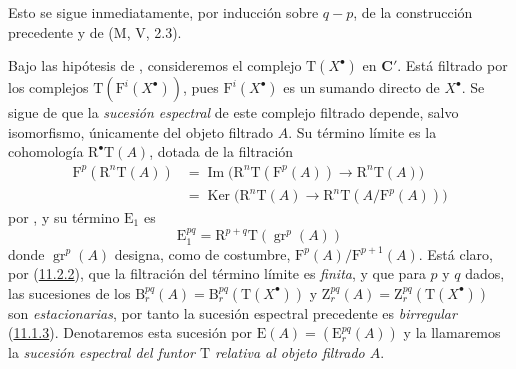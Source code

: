 Esto se sigue inmediatamente, por inducción sobre $q-p$, de la construcción
precedente y de (M, V, 2.3).

\begin{env}[13.6.4]
\label{0.13.6.4}
\label{0.13.6.4-fr}
Bajo las hipótesis de , consideremos el complejo
$\mathrm T(X^\bullet)$ en $\boldsymbol{C}'$.
Está filtrado por los complejos
$\mathrm T(\mathrm F^i(X^\bullet))$, pues
$\mathrm F^i(X^\bullet)$ es un sumando directo de $X^\bullet$.
Se sigue de  que la \emph{sucesión espectral} de
este complejo filtrado depende, salvo isomorfismo, únicamente del
objeto filtrado $A$.
Su término límite es la cohomología $\mathrm R^\bullet\mathrm T(A)$, dotada
de la filtración
\begin{equation}
\label{0.13.6.4.1-fr}
\tag{13.6.4.1}
\begin{split}
\mathrm F^p(\mathrm R^n\mathrm T(A))
&=\operatorname{Im}\bigl(\mathrm R^n\mathrm T(\mathrm F^p(A))
\longrightarrow\mathrm R^n\mathrm T(A)\bigr)\\
&=\operatorname{Ker}\bigl(\mathrm R^n\mathrm T(A)
\longrightarrow\mathrm R^n\mathrm T(A/\mathrm F^p(A))\bigr)
\end{split}
\end{equation}
por , y su término $\mathrm E_1$ es
\begin{equation}
\label{0.13.6.4.2-fr}
\tag{13.6.4.2}
\mathrm E_1^{pq}=\mathrm R^{p+q}\mathrm T(\operatorname{gr}^p(A))
\end{equation}
donde $\operatorname{gr}^p(A)$ designa, como de costumbre, $\mathrm F^p(A)/\mathrm F^{p+1}(A)$. Está claro, por (\hyperref[0.11.2.2-fr]{11.2.2}), que la filtración del término límite es \emph{finita}, y que para $p$ y $q$ dados, las sucesiones de los
$\mathrm B_r^{pq}(A)=\mathrm B_r^{pq}(\mathrm T(X^\bullet))$ y $\mathrm Z_r^{pq}(A)=\mathrm Z_r^{pq}(\mathrm T(X^\bullet))$ son \emph{estacionarias}, por tanto la sucesión espectral precedente es \emph{birregular} (\hyperref[0.11.1.3-fr]{11.1.3}). Denotaremos esta sucesión por $\mathrm E(A)=(\mathrm E_r^{pq}(A))$ y la llamaremos la
\emph{sucesión espectral del funtor $\mathrm T$ relativa al
objeto filtrado $A$}.
\end{env}

